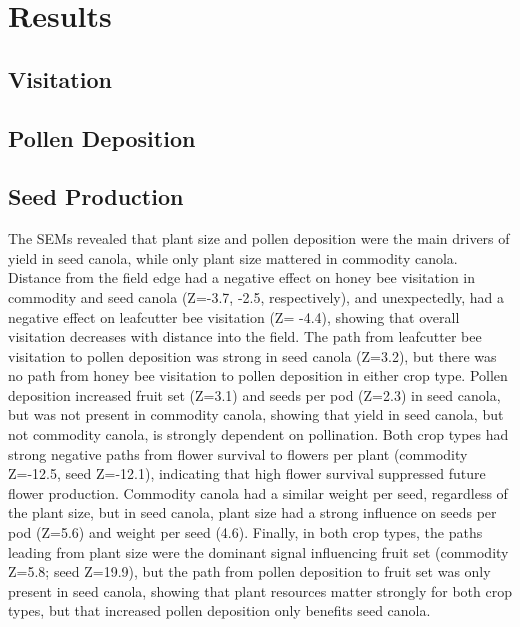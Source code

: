 \documentclass[12pt]{article} %
\begin{document}
\section{Results}


\subsection{Visitation}

\subsection{Pollen Deposition}

\subsection{Seed Production}

The SEMs revealed that plant size and pollen deposition were the main drivers of yield in seed canola, while only plant size mattered in commodity canola.
Distance from the field edge had a negative effect on honey bee visitation in commodity and seed canola (Z=-3.7, -2.5, respectively), and unexpectedly, had a negative effect on leafcutter bee visitation (Z= -4.4), showing that overall visitation decreases with distance into the field.
The path from leafcutter bee visitation to pollen deposition was strong in seed canola (Z=3.2), but there was no path from honey bee visitation to pollen deposition in either crop type.
Pollen deposition increased fruit set (Z=3.1) and seeds per pod (Z=2.3) in seed canola, but was not present in commodity canola, showing that yield in seed canola, but not commodity canola, is strongly dependent on pollination.
Both crop types had strong negative paths from flower survival to flowers per plant (commodity Z=-12.5, seed Z=-12.1), indicating that high flower survival suppressed future flower production.
Commodity canola had a similar weight per seed, regardless of the plant size, but in seed canola, plant size had a strong influence on seeds per pod (Z=5.6) and weight per seed (4.6).
Finally, in both crop types, the paths leading from plant size were the dominant signal influencing fruit set (commodity Z=5.8; seed Z=19.9), but the path from pollen deposition to fruit set was only present in seed canola, showing that plant resources matter strongly for both crop types, but that increased pollen deposition only benefits seed canola.
\end{document}
